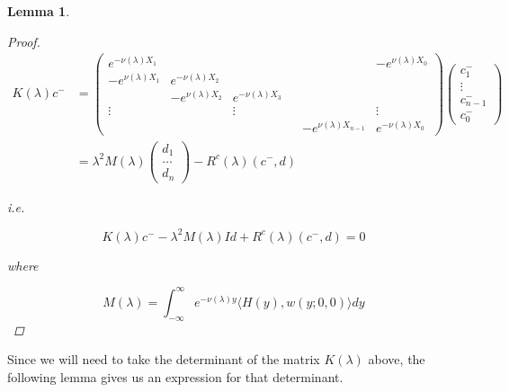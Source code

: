 \documentclass[12pt]{article}
\newtheorem{lemma}{Lemma}
\begin{document}
\begin{lemma}
\begin{proof}
\begin{align*}
K(\lambda) c^- &= 
\begin{pmatrix}
e^{-\nu(\lambda)X_1} & & & & & -e^{\nu(\lambda)X_0} \\
-e^{\nu(\lambda)X_1} & e^{-\nu(\lambda)X_2} \\
& -e^{\nu(\lambda)X_2} & e^{-\nu(\lambda)X_3} \\
\vdots & & \vdots & &&  \vdots \\
& & & & -e^{\nu(\lambda)X_{n-1}} & e^{-\nu(\lambda)X_0} 
\end{pmatrix}
\begin{pmatrix}
c_1^- \\ \vdots \\ c_{n-1}^- \\ c_0^-
\end{pmatrix} \\
&= \lambda^2 M(\lambda) \begin{pmatrix}
d_1 \\ \dots \\ d_n
\end{pmatrix} - R^c(\lambda)(c^-,d)
\end{align*}

i.e.

\begin{equation}
K(\lambda)c^- -\lambda^2 M(\lambda) I d + R^c(\lambda)(c^-,d) = 0
\end{equation}

where

\[
M(\lambda) = \int_{-\infty}^\infty e^{-\nu(\lambda)y} \langle H(y), w(y; 0, 0) \rangle dy
\]

\end{proof}
\end{lemma}

Since we will need to take the determinant of the matrix $K(\lambda)$ above, the following lemma gives us an expression for that determinant.
\end{document}
